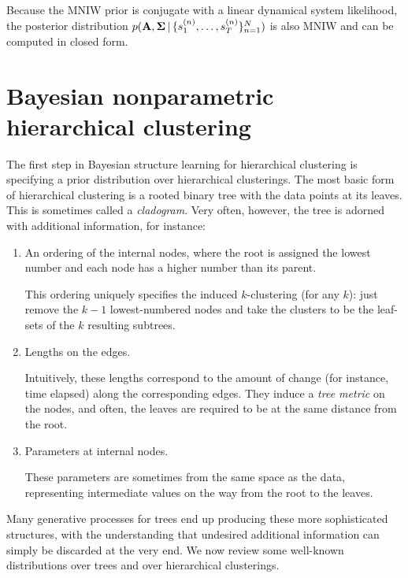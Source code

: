 Because the MNIW prior is conjugate
with a linear dynamical system likelihood,
the posterior distribution $p(\mathbf{A}, \bm{\Sigma} \,|\, \{s_1^{(n)}, \ldots, s_{T}^{(n)}\}_{n = 1}^{N})$ is also MNIW
and can be computed in closed form.

\section{Bayesian nonparametric hierarchical clustering}

The first step in Bayesian structure learning
for hierarchical clustering is specifying
a prior distribution over
hierarchical clusterings.
The most basic form of hierarchical clustering is a rooted binary tree with the data points at its leaves. This is sometimes called a {\it cladogram}. Very often, however, the tree is adorned with additional information, for instance:
\begin{enumerate}
\item An ordering of the internal nodes, where the root is assigned the lowest number and each node has a higher number than its parent.

This ordering uniquely specifies the induced $k$-clustering (for any $k$): just remove the $k-1$ lowest-numbered nodes and take the clusters to be the leaf-sets of the $k$ resulting subtrees.

\item Lengths on the edges.

Intuitively, these lengths correspond to the amount of change (for instance, time elapsed) along the corresponding edges. They induce a {\it tree metric} on the nodes, and often, the leaves are required to be at the same distance from the root.

\item Parameters at internal nodes.

These parameters are sometimes from the same space as the data, representing intermediate values on the way from the root to the leaves.
\end{enumerate}
Many generative processes for trees end up producing these more sophisticated structures, with the understanding that undesired additional information can simply be discarded at the very end. We now review some well-known distributions over trees and over hierarchical clusterings.

